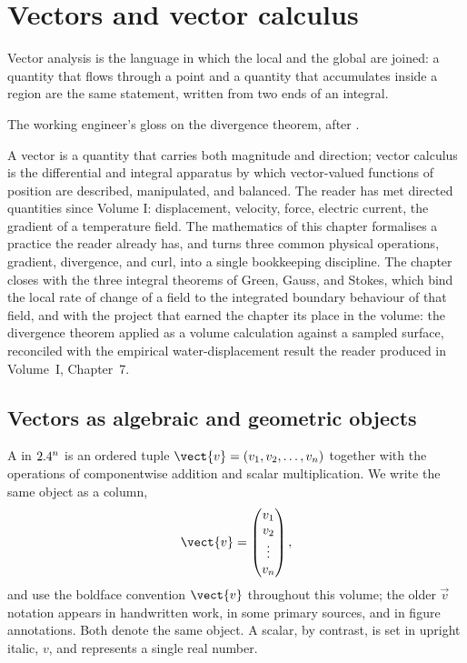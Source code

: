 \chapter{Vectors and vector calculus}
\label{vol02:ch08}

\epigraph{Vector analysis is the language in which the local and the
global are joined: a quantity that flows through a point and a quantity
that accumulates inside a region are the same statement, written from
two ends of an integral.}{The working engineer's gloss on the
divergence theorem, after \textcite{text:strang2016}.}


\noindent
A vector is a quantity that carries both magnitude and direction;
vector calculus is the differential and integral apparatus by which
vector-valued functions of position are described, manipulated, and
balanced. The reader has met directed quantities since Volume I:
displacement, velocity, force, electric current, the gradient of a
temperature field. The mathematics of this chapter formalises a
practice the reader already has, and turns three common physical
operations, gradient, divergence, and curl, into a single bookkeeping
discipline. The chapter closes with the three integral theorems of
Green, Gauss, and Stokes, which bind the local rate of change of a
field to the integrated boundary behaviour of that field, and with
the project that earned the chapter its place in the volume: the
divergence theorem applied as a volume calculation against a sampled
surface, reconciled with the empirical water-displacement result the
reader produced in Volume~I, Chapter~7.

\section{Vectors as algebraic and geometric objects}

A  in $2.4^{n}$ is an ordered tuple
$\vect{v} = (v_{1}, v_{2}, \ldots, v_{n})$ together with the
operations of componentwise addition and scalar multiplication. We
write the same object as a column,
\[
\vect{v} = \begin{pmatrix} v_{1} \\ v_{2} \\ \vdots \\ v_{n} \end{pmatrix},
\]
and use the boldface convention $\vect{v}$ throughout this volume; the
older $\vec{v}$ notation appears in handwritten work, in some primary
sources, and in figure annotations. Both denote the same object. A
scalar, by contrast, is set in upright italic, $v$, and represents a
single real number.

